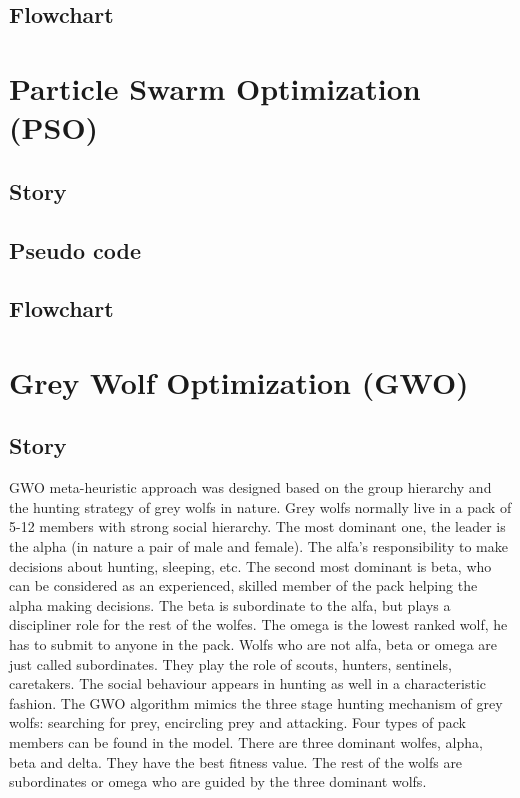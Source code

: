 \documentclass[border=0.2cm]{report}
\begin{document}
\section{Flowchart}

\chapter{Particle Swarm Optimization (PSO)}
\section{Story}
\section{Pseudo code}
\section{Flowchart}

\chapter{Grey Wolf Optimization (GWO)}
\section{Story}

GWO \cite{gwo1} meta-heuristic approach was designed based on the group hierarchy and the hunting strategy of grey wolfs in nature. Grey wolfs normally live in a pack of 5-12 members with strong social hierarchy. The most dominant one, the leader is the alpha (in nature a pair of male and female). The alfa's responsibility to make decisions about hunting, sleeping, etc. The second most dominant is beta, who can be considered as an experienced, skilled member of the pack helping the alpha making decisions. The beta is subordinate to the alfa, but plays a discipliner role for the rest of the wolfes. The omega is the lowest ranked wolf, he has to submit to anyone in the pack. Wolfs who are not alfa, beta or omega are just called subordinates. They play the role of scouts, hunters, sentinels, caretakers. The social behaviour appears in hunting as well in a characteristic fashion. The GWO algorithm mimics the three stage hunting mechanism of grey wolfs: searching for prey, encircling prey and attacking. Four types of pack members can be found in the model. There are three dominant wolfes, alpha, beta and delta. They have the best fitness value. The rest of the wolfs are subordinates or omega who are guided by the three dominant wolfs. \\
\end{document}
